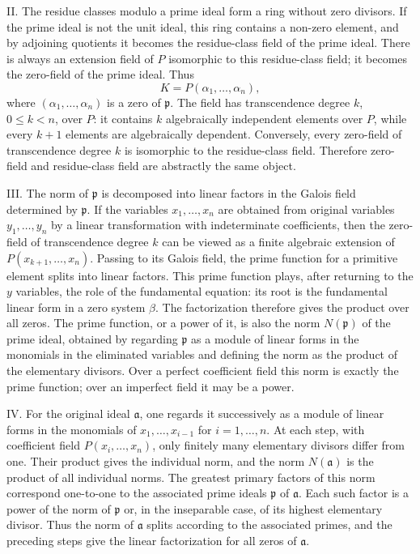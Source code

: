 \documentclass[12pt]{article}
\begin{document}
II. The residue classes modulo a prime ideal form a ring without zero divisors. If the prime ideal is not the unit ideal, this ring contains a non-zero element, and by adjoining quotients it becomes the residue-class field of the prime ideal. There is always an extension field of $P$ isomorphic to this residue-class field; it becomes the zero-field of the prime ideal. Thus
\[
  K=P(\alpha_1,\ldots,\alpha_n),
\]
where $(\alpha_1,\ldots,\alpha_n)$ is a zero of $\mathfrak p$. The field has transcendence degree $k$, $0\leq k<n$, over $P$: it contains $k$ algebraically independent elements over $P$, while every $k+1$ elements are algebraically dependent. Conversely, every zero-field of transcendence degree $k$ is isomorphic to the residue-class field. Therefore zero-field and residue-class field are abstractly the same object.

III. The norm of $\mathfrak p$ is decomposed into linear factors in the Galois field determined by $\mathfrak p$. If the variables $x_1,\ldots,x_n$ are obtained from original variables $y_1,\ldots,y_n$ by a linear transformation with indeterminate coefficients, then the zero-field of transcendence degree $k$ can be viewed as a finite algebraic extension of $P(x_{k+1},\ldots,x_n)$. Passing to its Galois field, the prime function for a primitive element splits into linear factors. This prime function plays, after returning to the $y$ variables, the role of the fundamental equation: its root is the fundamental linear form in a zero system $\beta$. The factorization therefore gives the product over all zeros. The prime function, or a power of it, is also the norm $N(\mathfrak p)$ of the prime ideal, obtained by regarding $\mathfrak p$ as a module of linear forms in the monomials in the eliminated variables and defining the norm as the product of the elementary divisors. Over a perfect coefficient field this norm is exactly the prime function; over an imperfect field it may be a power.

IV. For the original ideal $\mathfrak a$, one regards it successively as a module of linear forms in the monomials of $x_1,\ldots,x_{i-1}$ for $i=1,\ldots,n$. At each step, with coefficient field $P(x_i,
\ldots,x_n)$, only finitely many elementary divisors differ from one. Their product gives the individual norm, and the norm $N(\mathfrak a)$ is the product of all individual norms. The greatest primary factors of this norm correspond one-to-one to the associated prime ideals $\mathfrak p$ of $\mathfrak a$. Each such factor is a power of the norm of $\mathfrak p$ or, in the inseparable case, of its highest elementary divisor. Thus the norm of $\mathfrak a$ splits according to the associated primes, and the preceding steps give the linear factorization for all zeros of $\mathfrak a$.
\end{document}
